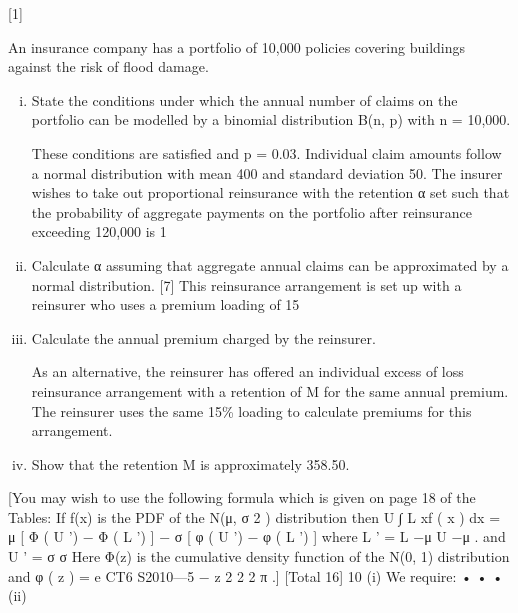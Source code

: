 \documentclass[a4paper,12pt]{article}
\begin{document}
 [1]
\item 
An insurance company has a portfolio of 10,000 policies covering buildings against the risk of flood damage.
\begin{enumerate}[(i)]
\item State the conditions under which the annual number of claims on the portfolio can be modelled by a binomial distribution B(n, p) with n = 10,000.

These conditions are satisfied and p = 0.03. Individual claim amounts follow a normal distribution with mean 400 and standard deviation 50. The insurer wishes to take out proportional reinsurance with the retention α set such that the probability of
aggregate payments on the portfolio after reinsurance exceeding 120,000 is 1%
\item %
Calculate α assuming that aggregate annual claims can be approximated by a
normal distribution.
[7]
This reinsurance arrangement is set up with a reinsurer who uses a premium loading
of 15%
\item %
Calculate the annual premium charged by the reinsurer.

As an alternative, the reinsurer has offered an individual excess of loss reinsurance
arrangement with a retention of M for the same annual premium. The reinsurer uses
the same 15\% loading to calculate premiums for this arrangement.
\item %
Show that the retention M is approximately 358.50.
\end{enumerate}
[You may wish to use the following formula which is given on page 18 of the Tables:
If f(x) is the PDF of the N(μ, σ 2 ) distribution then
U
∫ L
xf ( x ) dx = μ [ Φ ( U ') − Φ ( L ') ] − σ [ φ ( U ') − φ ( L ') ]
where L ' =
L −μ
U −μ
.
and U ' =
σ
σ
Here Φ(z) is the cumulative density function of the N(0, 1) distribution and
φ ( z ) =
e
CT6 S2010—5
−
z 2
2
2 π
.]
[Total 16]
\newpage
10
(i)
We require:
•
•
•
(ii)
\end{document}
